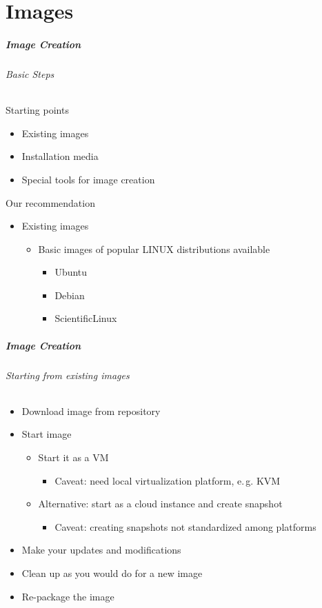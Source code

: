 \label{part_images}
\part{Images}

\begin{frame}
\frametitle{Image Creation}
\framesubtitle{Basic Steps}
Starting points
\begin{itemize}
\item Existing images
\item Installation media
\item Special tools for image creation
\end{itemize}
Our recommendation
\begin{itemize}
\item Existing images
  \begin{itemize}
  \item Basic images of popular LINUX distributions available
    \begin{itemize}
    \item Ubuntu
    \item Debian
    \item ScientificLinux
    \end{itemize}
  \end{itemize}
\end{itemize}
\end{frame}

\begin{frame}
\frametitle{Image Creation}
\framesubtitle{Starting from existing images}
\begin{itemize}
\item Download image from repository
\item Start image
  \begin{itemize}
  \item Start it as a VM
    \begin{itemize}
    \item Caveat: need local virtualization platform, e.\,g. KVM
    \end{itemize}
  \item Alternative: start as a cloud instance and create snapshot
    \begin{itemize}
    \item Caveat: creating snapshots not standardized among platforms
    \end{itemize}
  \end{itemize}
\item Make your updates and modifications
\item Clean up as you would do for a new image
\item Re-package the image
\end{itemize}

\end{frame}

